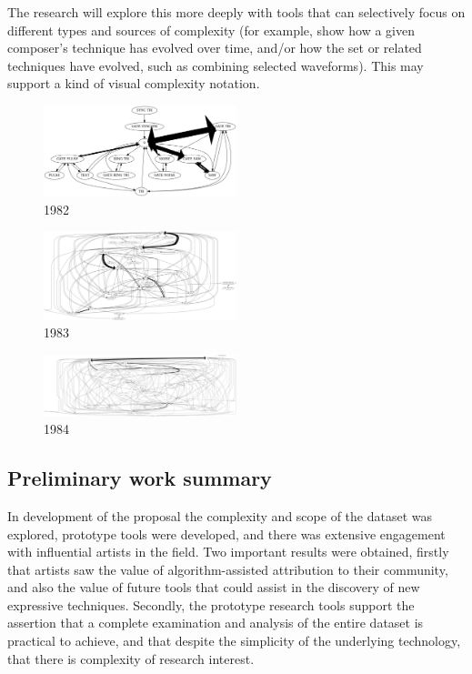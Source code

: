 \documentclass[10pt]{article}
\begin{document}
\begin{multicols*}{2}
The research will explore this more deeply with tools that can selectively focus on different types and sources of complexity (for example, show how a given composer’s technique has evolved over time, and/or how the set or related techniques have evolved, such as combining selected waveforms). This may support a kind of visual complexity notation.

\begin{figure}[H]
\includegraphics[width=0.5\textwidth]{1982}
\caption{1982}
\end{figure}

\begin{figure}[H]
\includegraphics[width=0.5\textwidth]{1983}
\caption{1983}
\end{figure}

\begin{figure}[H]
\includegraphics[width=0.5\textwidth]{1984}
\caption{1984}
\end{figure}

\subsection{Preliminary work summary}

In development of the proposal the complexity and scope of the dataset was explored, prototype tools were developed, and there was extensive engagement with influential artists in the field. Two important results were obtained, firstly that artists saw the value of algorithm-assisted attribution to their community, and also the value of future tools that could assist in the discovery of new expressive techniques. Secondly, the prototype research tools support the assertion that a complete examination and analysis of the entire dataset is practical to achieve, and that despite the simplicity of the underlying technology, that there is complexity of research interest.


\end{multicols*}
\end{document}
